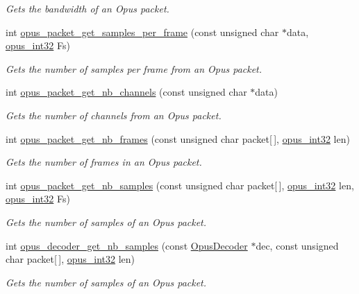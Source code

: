 \begin{DoxyCompactItemize}
\begin{DoxyCompactList}\small\item\em Gets the bandwidth of an Opus packet. \item\end{DoxyCompactList}\item 
int \hyperlink{group__opus__decoder_gab2a955acced631c6cb7876bbdc7953d4}{opus\_\-packet\_\-get\_\-samples\_\-per\_\-frame} (const unsigned char $\ast$data, \hyperlink{opus__types_8h_aa4d309d6f80b99dbabebc8f98879ab9a}{opus\_\-int32} Fs)
\begin{DoxyCompactList}\small\item\em Gets the number of samples per frame from an Opus packet. \item\end{DoxyCompactList}\item 
int \hyperlink{group__opus__decoder_ga4209376ddf8cc3379767e1749e1ef26d}{opus\_\-packet\_\-get\_\-nb\_\-channels} (const unsigned char $\ast$data)
\begin{DoxyCompactList}\small\item\em Gets the number of channels from an Opus packet. \item\end{DoxyCompactList}\item 
int \hyperlink{group__opus__decoder_ga064cb2ed9e77a934cd7db6c13b02c584}{opus\_\-packet\_\-get\_\-nb\_\-frames} (const unsigned char packet\mbox{[}$\,$\mbox{]}, \hyperlink{opus__types_8h_aa4d309d6f80b99dbabebc8f98879ab9a}{opus\_\-int32} len)
\begin{DoxyCompactList}\small\item\em Gets the number of frames in an Opus packet. \item\end{DoxyCompactList}\item 
int \hyperlink{group__opus__decoder_ga3cfec8b0bed7789ebd88c3b3370d337b}{opus\_\-packet\_\-get\_\-nb\_\-samples} (const unsigned char packet\mbox{[}$\,$\mbox{]}, \hyperlink{opus__types_8h_aa4d309d6f80b99dbabebc8f98879ab9a}{opus\_\-int32} len, \hyperlink{opus__types_8h_aa4d309d6f80b99dbabebc8f98879ab9a}{opus\_\-int32} Fs)
\begin{DoxyCompactList}\small\item\em Gets the number of samples of an Opus packet. \item\end{DoxyCompactList}\item 
int \hyperlink{group__opus__decoder_ga659135a16060f85908f63443a2325118}{opus\_\-decoder\_\-get\_\-nb\_\-samples} (const \hyperlink{group__opus__decoder_ga401d8579958d36094715a6b90cd159a6}{OpusDecoder} $\ast$dec, const unsigned char packet\mbox{[}$\,$\mbox{]}, \hyperlink{opus__types_8h_aa4d309d6f80b99dbabebc8f98879ab9a}{opus\_\-int32} len)
\begin{DoxyCompactList}\small\item\em Gets the number of samples of an Opus packet. \item\end{DoxyCompactList}\end{DoxyCompactItemize}


